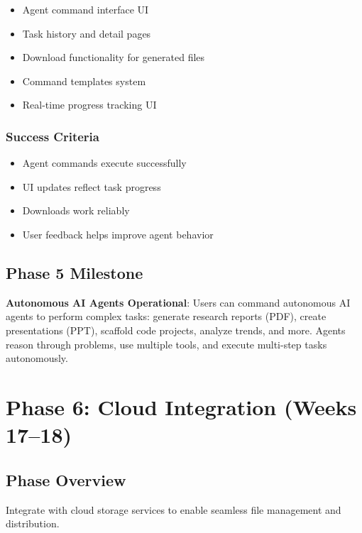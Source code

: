 \documentclass[12pt,oneside]{report}
\begin{document}
\begin{itemize}
    \item Agent command interface UI
    \item Task history and detail pages
    \item Download functionality for generated files
    \item Command templates system
    \item Real-time progress tracking UI
\end{itemize}

\subsubsection{Success Criteria}

\begin{itemize}
    \item Agent commands execute successfully
    \item UI updates reflect task progress
    \item Downloads work reliably
    \item User feedback helps improve agent behavior
\end{itemize}

\subsection{Phase 5 Milestone}

\textbf{Autonomous AI Agents Operational}: Users can command autonomous AI agents to perform complex tasks: generate research reports (PDF), create presentations (PPT), scaffold code projects, analyze trends, and more. Agents reason through problems, use multiple tools, and execute multi-step tasks autonomously.

\section{Phase 6: Cloud Integration (Weeks 17--18)}

\subsection{Phase Overview}

Integrate with cloud storage services to enable seamless file management and distribution.
\end{document}
